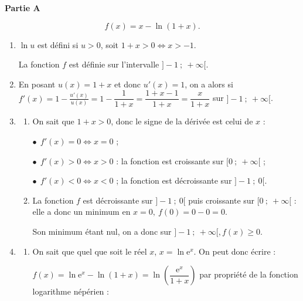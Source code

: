 
\medskip

\textbf{Partie A}

\medskip

\[f(x) = x - \ln (1 + x).\]

\begin{enumerate}
\item %
$\ln u$ est défini si $u > 0$, soit $1 + x > 0 \iff x > - 1$.

La fonction $f$ est définie sur l'intervalle $]-1~;~+ \infty[$.
\item %

En posant $u(x) = 1 + x$ et donc $u'(x) = 1$, on a alors  si $f'(x) = 1 - \frac{u'(x)}{u(x)} = 1 - \dfrac{1}{1 + x} = \dfrac{1 + x - 1}{1 + x} = \dfrac{x}{1 + x}$ sur $]-1~;~+ \infty[$.
\item 
	\begin{enumerate}
		\item %
On sait que $1 + x > 0$, donc le signe de la dérivée est celui de $x$ :
		
$\bullet~~f'(x) = 0 \iff x = 0$ ;

$\bullet~~f'(x) > 0 \iff x > 0$  : la fonction est croissante sur $[0~;~+ \infty[$ ;

$\bullet~~f'(x) < 0 \iff x < 0$ ; la fonction est décroissante sur $]-1~;~0[$.
		\item %
La fonction $f$ est décroissante sur $]-1~;~0[$ puis croissante sur $[0~;~+ \infty[$ : elle a donc un minimum en $x = 0, \: f(0 ) = 0 - 0 = 0$. 

Son minimum étant nul, on a donc sur $]-1~;~+ \infty[, f(x) \geqslant 0$.
	\end{enumerate}
\item 
	\begin{enumerate}
		\item %
On sait que quel que soit le réel $x$, $x = \ln \text{e}^x$. On peut donc écrire :

$f(x) = \ln \text{e}^x - \ln (1 + x) = \ln \left(\dfrac{\text{e}^x}{1 + x}\right)$ par propriété de la fonction logarithme népérien :


\end{enumerate}
\end{enumerate}
